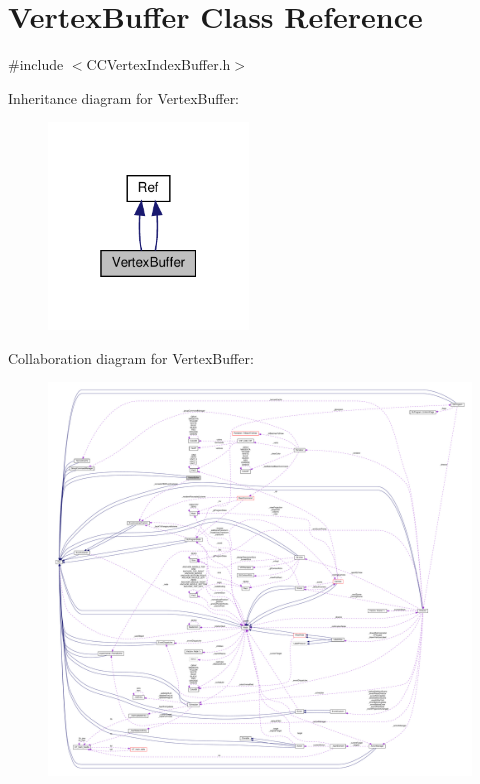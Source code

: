 \hypertarget{classVertexBuffer}{}\section{Vertex\+Buffer Class Reference}
\label{classVertexBuffer}


{\ttfamily \#include $<$C\+C\+Vertex\+Index\+Buffer.\+h$>$}



Inheritance diagram for Vertex\+Buffer\+:
\nopagebreak
\begin{figure}[H]
\begin{center}
\leavevmode
\includegraphics[width=151pt]{classVertexBuffer__inherit__graph}
\end{center}
\end{figure}


Collaboration diagram for Vertex\+Buffer\+:
\nopagebreak
\begin{figure}[H]
\begin{center}
\leavevmode
\includegraphics[width=350pt]{classVertexBuffer__coll__graph}
\end{center}
\end{figure}
